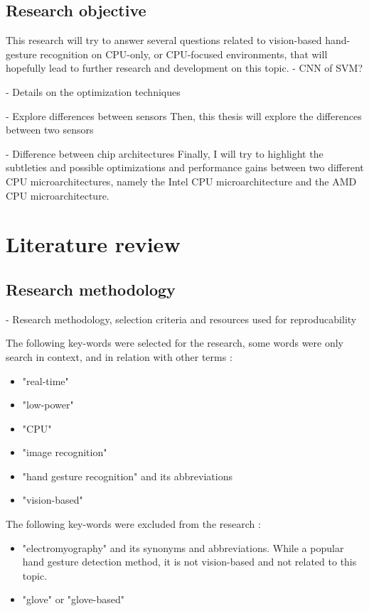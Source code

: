 \documentclass[12pt]{article}
\begin{document}
  \subsection{Research objective}

  This research will try to answer several questions related to vision-based hand-gesture recognition on CPU-only, or CPU-focused environments, that will hopefully lead to further research and development on this topic.
  - CNN of SVM?

  - Details on the optimization techniques

  - Explore differences between sensors
  Then, this thesis will explore the differences between two sensors 

  - Difference between chip architectures
  Finally, I will try to highlight the subtleties and possible optimizations and performance gains between two different CPU microarchitectures, namely the Intel CPU microarchitecture and the AMD CPU microarchitecture. 

  \section{Literature review}

  \subsection{Research methodology}

  - Research methodology, selection criteria and resources used for reproducability

  The following key-words were selected for the research, some words were only search in context, and in relation with other terms :
  \begin{itemize}
    \item "real-time"
    \item "low-power"
    \item "CPU"
    \item "image recognition"
    \item "hand gesture recognition" and its abbreviations
    \item "vision-based"
  \end{itemize}

  The following key-words were excluded from the research :
  \begin{itemize}
    \item "electromyography" and its synonyms and abbreviations. While a popular hand gesture detection method, it is not vision-based and not related to this topic.
    \item "glove" or "glove-based"
  \end{itemize}
\end{document}
